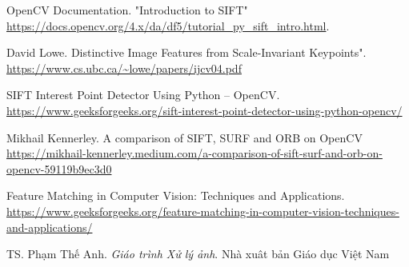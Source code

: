 \newpage
{}
\begin{thebibliography}{80}
     OpenCV Documentation. "Introduction to SIFT" \url{https://docs.opencv.org/4.x/da/df5/tutorial_py_sift_intro.html}.
    
	 David Lowe. Distinctive Image Features from Scale-Invariant Keypoints". \url{https://www.cs.ubc.ca/~lowe/papers/ijcv04.pdf}
	
	 SIFT Interest Point Detector Using Python – OpenCV. \url{https://www.geeksforgeeks.org/sift-interest-point-detector-using-python-opencv/}
	
	 Mikhail Kennerley. A comparison of SIFT, SURF and ORB on OpenCV
	\url{https://mikhail-kennerley.medium.com/a-comparison-of-sift-surf-and-orb-on-opencv-59119b9ec3d0}
	
	\bibitem{} Feature Matching in Computer Vision: Techniques and Applications.
	\url{https://www.geeksforgeeks.org/feature-matching-in-computer-vision-techniques-and-applications/}
	
	\bibitem{} TS. Phạm Thế Anh. \emph{Giáo trình Xử lý ảnh}. Nhà xuât bản Giáo dục Việt Nam
\end{thebibliography}